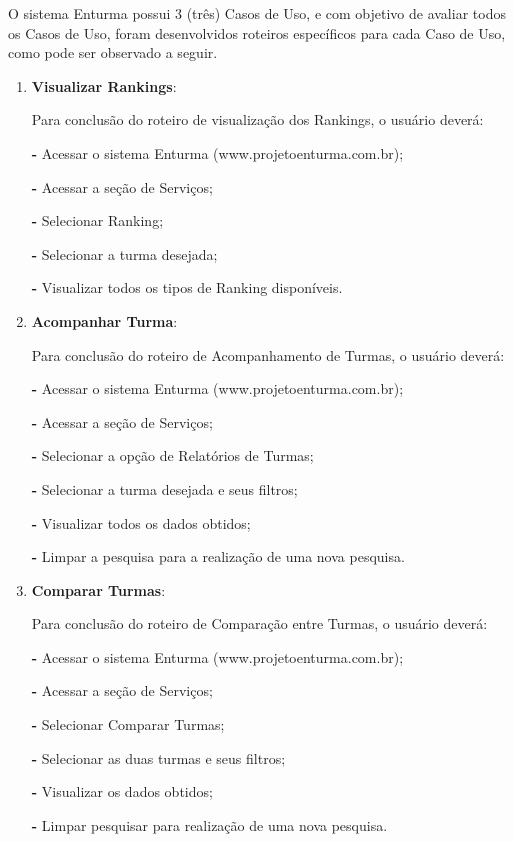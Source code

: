 	O sistema Enturma possui 3 (três) Casos de Uso, e com objetivo de avaliar todos os Casos de Uso, foram desenvolvidos roteiros específicos para cada Caso de Uso, como pode ser observado a seguir.


	\begin{enumerate}
		\item \textbf{Visualizar Rankings}:

			Para conclusão do roteiro de visualização dos Rankings, o usuário deverá:

				\textbf{-} Acessar o sistema Enturma (www.projetoenturma.com.br);
				
				\textbf{-} Acessar a seção de Serviços;
				
				\textbf{-} Selecionar Ranking;
				
				\textbf{-} Selecionar a turma desejada;
				
				\textbf{-} Visualizar todos os tipos de Ranking disponíveis.

		\item \textbf{Acompanhar Turma}:
			
			Para conclusão do roteiro de Acompanhamento de Turmas, o usuário deverá:
				
				\textbf{-} Acessar o sistema Enturma (www.projetoenturma.com.br);
				
				\textbf{-} Acessar a seção de Serviços;
				
				\textbf{-} Selecionar a opção de Relatórios de Turmas;
				
				\textbf{-} Selecionar a turma desejada e seus filtros;
				
				\textbf{-} Visualizar todos os dados obtidos;
				
				\textbf{-} Limpar a pesquisa para a realização de uma nova pesquisa.

		\item \textbf{Comparar Turmas}:

			Para conclusão do roteiro de Comparação entre Turmas, o usuário deverá:
				
				\textbf{-} Acessar o sistema Enturma (www.projetoenturma.com.br);
				
				\textbf{-} Acessar a seção de Serviços;
				
				\textbf{-} Selecionar Comparar Turmas;
				
				\textbf{-} Selecionar as duas turmas e seus filtros;
				
				\textbf{-} Visualizar os dados obtidos;
				
				\textbf{-} Limpar pesquisar para realização de uma nova pesquisa.

	\end{enumerate}

